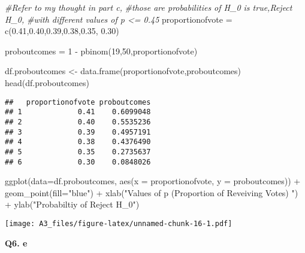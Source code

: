 \documentclass[
]{article}
\newenvironment{Shaded}{\begin{snugshade}}{\end{snugshade}}
\newcommand{\AttributeTok}[1]{\textcolor[rgb]{0.77,0.63,0.00}{#1}}
\newcommand{\CommentTok}[1]{\textcolor[rgb]{0.56,0.35,0.01}{\textit{#1}}}
\newcommand{\DecValTok}[1]{\textcolor[rgb]{0.00,0.00,0.81}{#1}}
\newcommand{\FloatTok}[1]{\textcolor[rgb]{0.00,0.00,0.81}{#1}}
\newcommand{\FunctionTok}[1]{\textcolor[rgb]{0.00,0.00,0.00}{#1}}
\newcommand{\NormalTok}[1]{#1}
\newcommand{\OtherTok}[1]{\textcolor[rgb]{0.56,0.35,0.01}{#1}}
\newcommand{\SpecialCharTok}[1]{\textcolor[rgb]{0.00,0.00,0.00}{#1}}
\newcommand{\StringTok}[1]{\textcolor[rgb]{0.31,0.60,0.02}{#1}}
\begin{document}
\begin{Shaded}
\begin{Highlighting}[]
\CommentTok{\#Refer to my thought in part c, }
\CommentTok{\#those are probabilities of H\_0 is true,Reject H\_0, }
\CommentTok{\#with different values of p \textless{}= 0.45}
\NormalTok{proportionofvote }\OtherTok{=} \FunctionTok{c}\NormalTok{(}\FloatTok{0.41}\NormalTok{,}\FloatTok{0.40}\NormalTok{,}\FloatTok{0.39}\NormalTok{,}\FloatTok{0.38}\NormalTok{,}\FloatTok{0.35}\NormalTok{, }\FloatTok{0.30}\NormalTok{)}


\NormalTok{proboutcomes }\OtherTok{=} \DecValTok{1} \SpecialCharTok{{-}} \FunctionTok{pbinom}\NormalTok{(}\DecValTok{19}\NormalTok{,}\DecValTok{50}\NormalTok{,proportionofvote)}

\NormalTok{df.proboutcomes }\OtherTok{\textless{}{-}} \FunctionTok{data.frame}\NormalTok{(proportionofvote,proboutcomes)}
\FunctionTok{head}\NormalTok{(df.proboutcomes)}
\end{Highlighting}
\end{Shaded}

\begin{verbatim}
##   proportionofvote proboutcomes
## 1             0.41    0.6099048
## 2             0.40    0.5535236
## 3             0.39    0.4957191
## 4             0.38    0.4376490
## 5             0.35    0.2735637
## 6             0.30    0.0848026
\end{verbatim}

\begin{Shaded}
\begin{Highlighting}[]
\FunctionTok{ggplot}\NormalTok{(}\AttributeTok{data=}\NormalTok{df.proboutcomes, }\FunctionTok{aes}\NormalTok{(}\AttributeTok{x =}\NormalTok{ proportionofvote, }\AttributeTok{y =}\NormalTok{ proboutcomes)) }\SpecialCharTok{+} \FunctionTok{geom\_point}\NormalTok{(}\AttributeTok{fill=}\StringTok{"blue"}\NormalTok{) }\SpecialCharTok{+} \FunctionTok{xlab}\NormalTok{(}\StringTok{"Values of p (Proportion of Reveiving Votes) "}\NormalTok{) }\SpecialCharTok{+} \FunctionTok{ylab}\NormalTok{(}\StringTok{"Probabiltiy of Reject H\_0"}\NormalTok{)}
\end{Highlighting}
\end{Shaded}

\texttt{[image: A3\_files/figure-latex/unnamed-chunk-16-1.pdf]}

\textbf{Q6. e}
\end{document}
